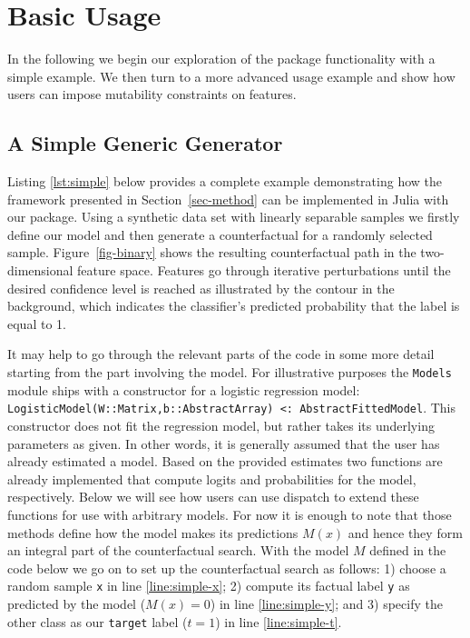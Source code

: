 \documentclass[
  letterpaper,
  DIV=11,
  numbers=noendperiod]{scrartcl}
\begin{document}
\hypertarget{sec-use}{%
\section{Basic Usage}\label{sec-use}}

In the following we begin our exploration of the package functionality
with a simple example. We then turn to a more advanced usage example and
show how users can impose mutability constraints on features.

\hypertarget{a-simple-generic-generator}{%
\subsection{A Simple Generic
Generator}\label{a-simple-generic-generator}}

Listing \ref{lst:simple} below provides a complete example demonstrating
how the framework presented in Section~\ref{sec-method} can be
implemented in Julia with our package. Using a synthetic data set with
linearly separable samples we firstly define our model and then generate
a counterfactual for a randomly selected sample. Figure~\ref{fig-binary}
shows the resulting counterfactual path in the two-dimensional feature
space. Features go through iterative perturbations until the desired
confidence level is reached as illustrated by the contour in the
background, which indicates the classifier's predicted probability that
the label is equal to 1.

It may help to go through the relevant parts of the code in some more
detail starting from the part involving the model. For illustrative
purposes the \texttt{Models} module ships with a constructor for a
logistic regression model:
\texttt{LogisticModel(W::Matrix,b::AbstractArray)\ \textless{}:\ AbstractFittedModel}.
This constructor does not fit the regression model, but rather takes its
underlying parameters as given. In other words, it is generally assumed
that the user has already estimated a model. Based on the provided
estimates two functions are already implemented that compute logits and
probabilities for the model, respectively. Below we will see how users
can use dispatch to extend these functions for use with arbitrary
models. For now it is enough to note that those methods define how the
model makes its predictions \(M(x)\) and hence they form an integral
part of the counterfactual search. With the model \(M\) defined in the
code below we go on to set up the counterfactual search as follows: 1)
choose a random sample \texttt{x} in line \ref{line:simple-x}; 2)
compute its factual label \texttt{y} as predicted by the model
(\(M(x)=0\)) in line \ref{line:simple-y}; and 3) specify the other class
as our \texttt{target} label (\(t=1\)) in line \ref{line:simple-t}.
\end{document}
